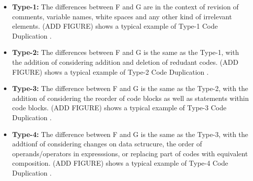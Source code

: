 \begin{itemize}
	\item \textbf{Type-1:} The differences between F and G are in the context of revision of comments, variable names, white spaces and any other kind of irrelevant elements. (ADD FIGURE) shows a typical example of Type-1 Code Duplication \citep{litreview}. 

	\item \textbf{Type-2:} The differences between F and G is the same as the Type-1, with the addition of considering addition and deletion of redudant codes. (ADD FIGURE) shows a typical example of Type-2 Code Duplication \citep{litreview}. 

	\item \textbf{Type-3:} The difference between F and G is the same as the Type-2, with the addition of considering the reorder of code blocks as well as statements within code blocks. (ADD FIGURE) shows a typical example of Type-3 Code Duplication \citep{litreview}. 

	\item \textbf{Type-4:} The difference between F and G is the same as the Type-3, with the addtionf of considering changes on data sctrucure, the order of operands/operators in expresssions, or replacing part of codes with equivalent composition. (ADD FIGURE) shows a typical example of Type-4 Code Duplication \citep{litreview}. 
\end{itemize}









